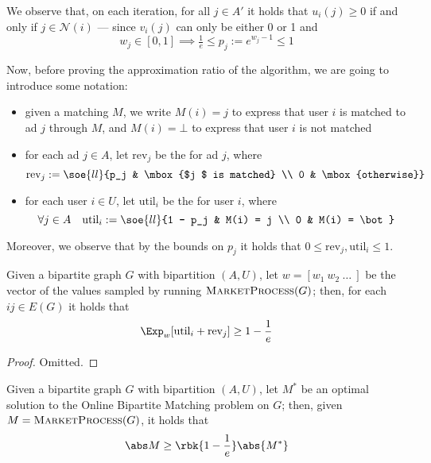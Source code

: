 \documentclass[a4paper, 12pt]{report}
\begin{document}
    We observe that, on each iteration, for all $j \in A'$ it holds that $u_i(j) \ge 0$ if and only if $j \in \mathcal N (i)$ --- since $v_i(j)$ can only be either 0 or 1 and $$w_j \in [0,1] \implies \tfrac{1}{e} \le p_j := e^{w_j - 1} \le 1$$

    Now, before proving the approximation ratio of the algorithm, we are going to introduce some notation:

    \begin{itemize}
        \item given a matching $M$, we write $M(i) = j$ to express that user $i$ is matched to ad $j$ through $M$, and $M(i) = \bot$ to express that user $i$ is not matched
        \item for each ad $j \in A$, let $\mbox{rev}_j$ be the  for ad $j$, where $$\mbox{rev}_j := \soe{ll}{p_j & \mbox{$j $ is matched} \\ 0 & \mbox{otherwise}}$$
        \item for each user $i \in U$, let $\mbox{util}_i$ be the  for user $i$, where $$\forall j \in A \quad \mbox{util}_i := \soe{ll}{1 - p_j & M(i) = j \\ 0 & M(i) = \bot}$$
    \end{itemize}

    Moreover, we observe that by the bounds on $p_j$ it holds that $0 \le \mbox{rev}_j, \mbox{util}_i \le 1$.
 
    \begin{framedlem}{}
        Given a bipartite graph $G$ with bipartition $(A, U)$, let $w = [w_1 \ w_2 \ \ldots \ ]$ be the vector of the values sampled by running $\textsc{MarketProcess}(G)$; then, for each $ij \in E(G)$ it holds that $$\Exp_w[\mbox{util}_i + \mbox{rev}_j] \ge 1 - \dfrac{1}{e}$$
    \end{framedlem}

    \begin{proof}
        Omitted.
    \end{proof}

    \begin{framedthm}{}
        Given a bipartite graph $G$ with bipartition $(A, U)$, let $M^*$ be an optimal solution to the Online Bipartite Matching problem on $G$; then, given $M = \textsc{MarketProcess}(G)$, it holds that $$\abs M \ge \rbk{1 - \dfrac{1}{e}} \abs{M^*}$$
    \end{framedthm}
\end{document}
